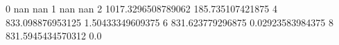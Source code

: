 0 nan nan
1 nan nan
2 1017.3296508789062 185.735107421875
4 833.098876953125 1.50433349609375
6 831.623779296875 0.02923583984375
8 831.5945434570312 0.0
